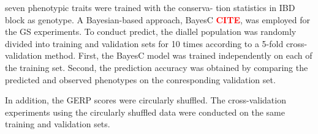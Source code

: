 \documentclass[10pt]{article}
\newcommand{\sme}[1]{\textcolor{red}{\bf #1}}
\begin{document}
seven phenotypic traits were trained with the conserva- tion statistics in IBD block as genotype.
A Bayesian-based approach, BayesC \sme{CITE}, was employed for the GS experiments. To conduct predict, the diallel population was randomly divided into training and validation sets for 10 times according to a 5-fold cross-validation method. First, the BayesC model was trained independently on each of the training set. Second, the prediction accuracy was obtained by comparing the predicted and observed phenotypes on the conresponding validation set. 


In addition, the GERP scores were circularly shuffled. The cross-validation experiments using the circularly shuffled data were conducted on the same training and validation sets.  


\clearpage

\end{document}
